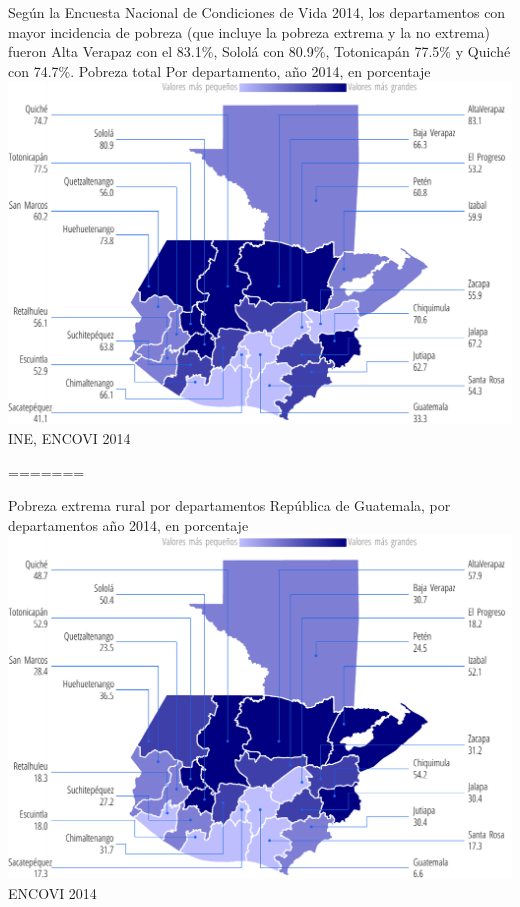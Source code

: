                      {%
                  Según la Encuesta Nacional de Condiciones de Vida 2014, los departamentos con mayor incidencia de pobreza (que incluye la pobreza extrema y la no extrema) fueron Alta Verapaz con el 83.1\%, Sololá con 80.9\%, Totonicapán 77.5\% y Quiché con 74.7\%. }%
                     {%
                     	Pobreza total
                     } %
                     {%
                     Por departamento, año 2014, en porcentaje} %
                     {%
                     	\includegraphics[width=52\cuadri]{graficas/1_19.pdf}}%
                     {%
                     	INE, ENCOVI 2014} %
                     
=======
                    
                    {%
                    }%
                    {%
                    	Pobreza extrema rural por departamentos
                    } %
                    {%
                    	República de Guatemala, por departamentos año 2014, en porcentaje} %
                    {%
                    	\includegraphics[width=52\cuadri]{graficas/1_16.pdf}}%
                    {%
                    	ENCOVI 2014} %
                    

